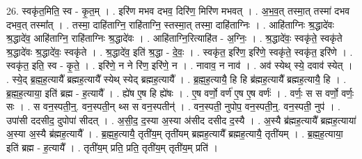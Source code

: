 \documentclass[17pt]{extarticle}
\begin{document}
26. स्वकृ॑त॒मिति॒ स्व - कृ॒त॒म् । . इरि॑ण मभव दभव॒ दिरि॑ण॒ मिरि॑ण मभवत् । . अ॒भ॒व॒त् तस्मा॒त् तस्मा॑ दभव दभव॒त् तस्मा᳚त् । . तस्मा॒ दाहि॑ताग्नि॒ राहि॑ताग्नि॒ स्तस्मा॒त् तस्मा॒ दाहि॑ताग्निः । . आहि॑ताग्निः श्र॒द्धादे॑वः श्र॒द्धादे॑व॒ आहि॑ताग्नि॒ राहि॑ताग्निः श्र॒द्धादे॑वः । . आहि॑ताग्नि॒रित्याहि॑त - अ॒ग्निः॒ । . श्र॒द्धादे॑वः॒ स्वकृ॑ते॒ स्वकृ॑ते श्र॒द्धादे॑वः श्र॒द्धादे॑वः॒ स्वकृ॑ते । . श्र॒द्धादे॑व॒ इति॑ श्र॒द्धा - दे॒वः॒ । . स्वकृ॑त॒ इरि॑ण॒ इरि॑णे॒ स्वकृ॑ते॒ स्वकृ॑त॒ इरि॑णे । . स्वकृ॑त॒ इति॒ स्व - कृ॒ते॒ । . इरि॑णे॒ न ने रि॑ण॒ इरि॑णे॒ न । . नावाव॒ न नाव॑ । . अव॑ स्येथ् स्ये॒ दवाव॑ स्येत् । . स्ये॒द् ब्र॒ह्म॒ह॒त्यायै᳚ ब्रह्मह॒त्यायै᳚ स्येथ् स्येद् ब्रह्मह॒त्यायै᳚ । . ब्र॒ह्म॒ह॒त्यायै॒ हि हि ब्र॑ह्मह॒त्यायै᳚ ब्रह्मह॒त्यायै॒ हि । . ब्र॒ह्म॒ह॒त्याया॒ इति॑ ब्रह्म - ह॒त्यायै᳚ । . ह्ये॑ष ए॒ष हि ह्ये॑षः । . ए॒ष वर्णो॒ वर्ण॑ ए॒ष ए॒ष वर्णः॑ । . वर्णः॒ स स वर्णो॒ वर्णः॒ सः । . स वन॒स्पती॒न्॒. वन॒स्पती॒न् थ्स स वन॒स्पतीन्॑ । . वन॒स्पती॒ नुपोप॒ वन॒स्पती॒न्॒. वन॒स्पती॒ नुप॑ । . उपा॑सी ददसीद॒ दुपोपा॑ सीदत् । . अ॒सी॒द॒ द॒स्या अ॒स्या अ॑सीद दसीद द॒स्यै । . अ॒स्यै ब्र॑ह्मह॒त्यायै᳚ ब्रह्मह॒त्याया॑ अ॒स्या अ॒स्यै ब्र॑ह्मह॒त्यायै᳚ । . ब्र॒ह्म॒ह॒त्यायै॒ तृती॑य॒म् तृती॑यम् ब्रह्मह॒त्यायै᳚ ब्रह्मह॒त्यायै॒ तृती॑यम् । . ब्र॒ह्म॒ह॒त्याया॒ इति॑ ब्रह्म - ह॒त्यायै᳚ । . तृती॑य॒म् प्रति॒ प्रति॒ तृती॑य॒म् तृती॑य॒म् प्रति॑ । \newline
\end{document}
